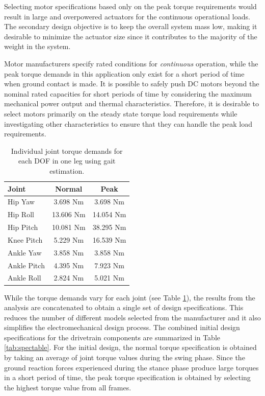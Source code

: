 Selecting motor specifications based only on the peak torque requirements would result in large and overpowered actuators for the continuous operational loads. The secondary design objective is to keep the overall system mass low, making it desirable to minimize the actuator size since it contributes to the majority of the weight in the system. 

Motor manufacturers specify rated conditions for \emph{continuous} operation, while the peak torque demands in this application only exist for a short period of time when ground contact is made. It is possible to safely push DC motors beyond the nominal rated capacities for short periods of time by considering the maximum mechanical power output and thermal characteristics. Therefore, it is desirable to select motors primarily on the steady state torque load requirements while investigating other characteristics to ensure that they can handle the peak load requirements. 

\begin{table}[!h]
  \centering
  \caption{Individual joint torque demands for each DOF in one leg using gait estimation.}
    \begin{tabular}{lcc}
    \addlinespace
    \toprule
    \textbf{Joint} & \textbf{Normal} & \textbf{Peak}\\
    \midrule
    Hip Yaw		&	3.698 Nm	&	3.698 Nm\\
    Hip Roll	&	13.606 Nm	&	14.054 Nm\\
    Hip Pitch	&	10.081 Nm	&	38.295 Nm\\
    Knee Pitch  &	5.229 Nm	&	16.539 Nm\\
    Ankle Yaw	&	3.858 Nm	&	3.858 Nm\\
    Ankle Pitch	&	4.395 Nm	&	7.923 Nm\\
    Ankle Roll	&	2.824 Nm	&	5.021 Nm\\
    \bottomrule
    \end{tabular}%
  \label{jointtable}%
\end{table}%

While the torque demands vary for each joint (see Table \ref{jointtable}), the results from the analysis are concatenated to obtain a single set of design specifications. This reduces the number of different models selected from the manufacturer and it also simplifies the electromechanical design process. The combined initial design specifications for the drivetrain components are summarized in Table \ref{tab:spectable}. For the initial design, the normal torque specification is obtained by taking an average of joint torque values during the swing phase. Since the ground reaction forces experienced during the stance phase produce large torques in a short period of time, the peak torque specification is obtained by selecting the highest torque value from all frames. 

